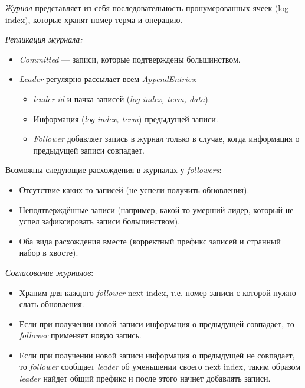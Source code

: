 \begin{definition}
    \textit{Журнал} представляет из себя последовательность пронумерованных
    ячеек (log index), которые хранят номер терма и операцию.
\end{definition}

\begin{algorithm} \textit{Репликация журнала:}
    \begin{itemize}
        \item \textit{Committed} --- записи, которые подтверждены большинством.
        \item \textit{Leader} регулярно рассылает всем \textit{AppendEntries}:
            \begin{itemize}
                \item \textit{leader id} и пачка записей (\textit{log index, term, data}).
                \item Информация (\textit{log index, term}) предыдущей записи.
                \item \textit{Follower} добавляет запись в журнал только в случае,
                    когда информация о предыдущей записи совпадает.
            \end{itemize}
    \end{itemize}
\end{algorithm}

\begin{remark}
    Возможны следующие расхождения в журналах у \textit{followers}:
    \begin{itemize}
        \item Отсутствие каких-то записей (не успели получить обновления).
        \item Неподтверждённые записи (например, какой-то умерший лидер,
            который не успел зафиксировать записи большинством).
        \item Оба вида расхождения вместе (корректный префикс записей и странный набор в хвосте).
    \end{itemize}
\end{remark}

\begin{algorithm} \textit{Согласование журналов}:
    \begin{itemize}
        \item Храним для каждого \textit{follower} next index, т.е. номер
            записи с которой нужно слать обновления.
        \item Если при получении новой записи информация о предыдущей совпадает, то
            \textit{follower} применяет новую запись.
        \item Если при получении новой записи информация о предыдущей не совпадает,
            то \textit{follower} сообщает \textit{leader} об уменьшении своего next index,
            таким образом \textit{leader} найдет общий префикс и после этого начнет добавлять записи.
    \end{itemize}
\end{algorithm}


